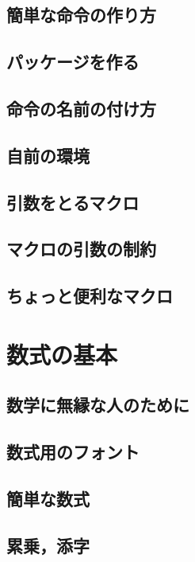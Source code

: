 \documentclass{jsbook}
\begin{document}
\section{簡単な命令の作り方}

\section{パッケージを作る}

\section{命令の名前の付け方}

\section{自前の環境}

\section{引数をとるマクロ}

\section{マクロの引数の制約}

\section{ちょっと便利なマクロ}

\chapter{数式の基本}

\section{数学に無縁な人のために}

\section{数式用のフォント}

\section{簡単な数式}

\section{累乗，添字}
\end{document}
